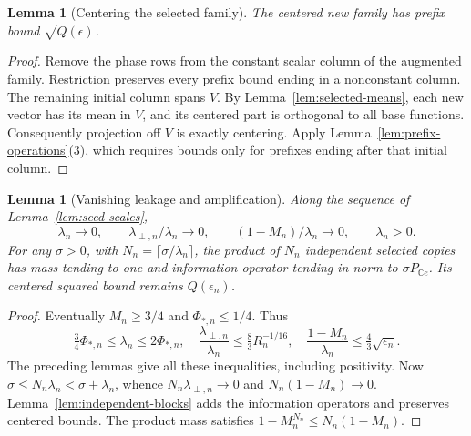 \documentclass[reqno,a4paper,12pt]{amsart}
\newtheorem{lemma}[theorem]{Lemma}
\theoremstyle{definition}
\newcommand{\C}{\mathbb C}
\begin{document}
\begin{lemma}[Centering the selected family]\label{lem:selected-prefix}
The centered new family has prefix bound $\sqrt{Q(\epsilon)}$.
\end{lemma}
\begin{proof}
Remove the phase rows from the constant scalar column of the augmented
family. Restriction preserves every prefix bound ending in a
nonconstant column. The remaining initial column spans $V$.
By Lemma~\ref{lem:selected-means}, each new vector has its mean in
$V$, and its centered part is orthogonal to all base functions.
Consequently projection off $V$ is exactly centering.
Apply Lemma~\ref{lem:prefix-operations}(3), which requires bounds
only for prefixes ending after that initial column.
\end{proof}

\begin{lemma}[Vanishing leakage and amplification]\label{lem:amplification}
Along the sequence of Lemma~\ref{lem:seed-scales},
\[
 \lambda_n\to0,\qquad
 \lambda_{\perp,n}/\lambda_n\to0,\qquad
 (1-M_n)/\lambda_n\to0,\qquad \lambda_n>0.
\]
For any $\sigma>0$, with $N_n=\lceil\sigma/\lambda_n\rceil$,
the product of $N_n$ independent selected copies has mass tending
to one and information operator tending in norm to $\sigma P_{\C e}$.
Its centered squared bound remains $Q(\epsilon_n)$.
\end{lemma}
\begin{proof}
Eventually $M_n\ge3/4$ and $\Phi_{*,n}\le1/4$. Thus
\[
 \tfrac34\Phi_{*,n}\le\lambda_n\le2\Phi_{*,n},\quad
 \frac{\lambda_{\perp,n}}{\lambda_n}\le
 \tfrac83 R_n^{-1/16},\quad
 \frac{1-M_n}{\lambda_n}\le\tfrac43\sqrt{\epsilon_n}.
\]
The preceding lemmas give all these inequalities, including positivity.
Now $\sigma\le N_n\lambda_n<\sigma+\lambda_n$, whence
$N_n\lambda_{\perp,n}\to0$ and $N_n(1-M_n)\to0$.
Lemma~\ref{lem:independent-blocks} adds the information operators and
preserves centered bounds. The product mass satisfies
$1-M_n^{N_n}\le N_n(1-M_n)$.
\end{proof}
\end{document}
